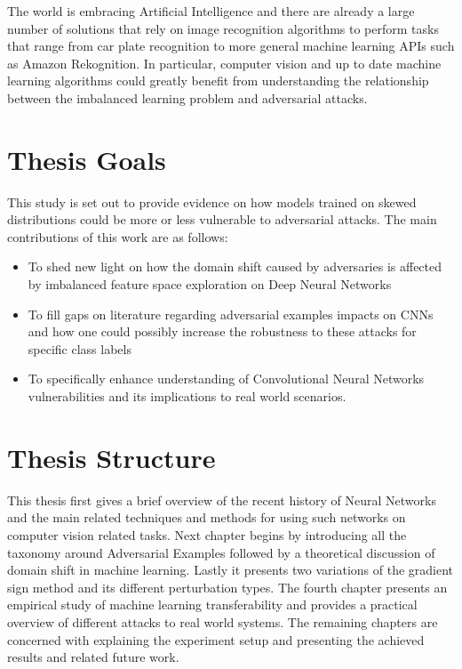 The world is embracing Artificial Intelligence and there are already a large number of solutions that rely on image recognition algorithms to perform tasks that range from car plate recognition to more general machine learning APIs such as Amazon Rekognition. In particular, computer vision and up to date machine learning algorithms could greatly benefit from understanding the relationship between the imbalanced learning problem and adversarial attacks.

\section{Thesis Goals}
This study is set out to provide evidence on how models trained on skewed distributions could be more or less vulnerable to adversarial attacks. The main contributions of this work are as follows:
\begin{itemize}
	\item To shed new light on how the domain shift caused by adversaries is affected by imbalanced feature space exploration on Deep Neural Networks
	\item To fill gaps on literature regarding adversarial examples impacts on CNNs and how one could possibly increase the robustness to these attacks for specific class labels
	\item To specifically enhance understanding of Convolutional Neural Networks vulnerabilities and its implications to real world scenarios.
\end{itemize}

\section{Thesis Structure}

This thesis first gives a brief overview of the recent history of Neural Networks and the main related techniques and methods for using such networks on computer vision related tasks. Next chapter begins by introducing all the taxonomy around Adversarial Examples followed by a theoretical discussion of domain shift in machine learning. Lastly it presents two variations of the gradient sign method and its different perturbation types. The fourth chapter presents an empirical study of machine learning transferability and provides a practical overview of different attacks to real world systems. The remaining chapters are concerned with explaining the experiment setup and presenting the achieved results and related future work.
